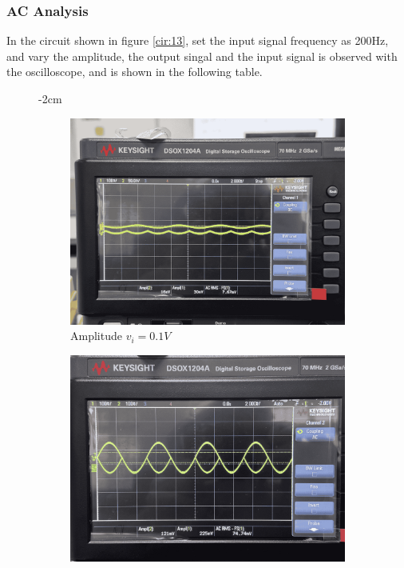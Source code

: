     \subsubsection{AC Analysis}
    In the circuit shown in figure \ref{cir:13}, set the input signal frequency as 200Hz, and vary the amplitude, the output singal and the input signal is observed with the oscilloscope, and is shown in the following table.\par
    \begin{figure}[H]
        \centering
        \addtolength{\leftskip} {-2cm}
        \addtolength{\rightskip}{-2cm}

        \begin{subfigure}{0.3\linewidth}
            \includegraphics[width=1\linewidth]{Experiment_13/Images/13_0-1v.jpg}
            \caption{Amplitude $v_i=0.1V$}
            \label{wave:13-AC0}
        \end{subfigure}
        \begin{subfigure}{0.3\linewidth}
            \includegraphics[width=1\linewidth]{Experiment_13/Images/13_1v.jpg}

\end{subfigure}
\end{figure}
